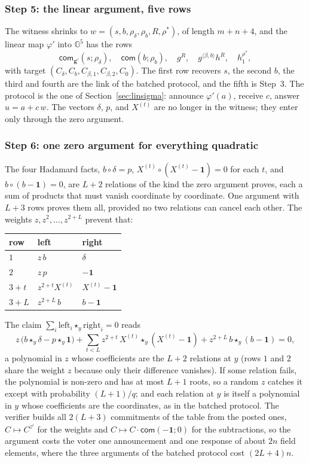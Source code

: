 \documentclass[11pt,a4paper]{article}
\newcommand{\G}{\mathbb{G}}
\newcommand{\com}{\mathsf{com}}
\theoremstyle{remark}
\begin{document}
\subsubsection*{Step 5: the linear argument, five rows}
The witness shrinks to $w = (s, b, \rho_\delta, \rho_b, R, \rho^*)$, of
length $m + n + 4$, and the linear map $\varphi'$ into $\G^5$ has the rows
\[
  \com_{\mathbf{g}'}(s; \rho_\delta),\quad \com(b; \rho_b),\quad g^{R},\quad
  g^{\langle \beta, b \rangle} h^{R},\quad h_1^{\rho^*},
\]
with target $(C_\delta, C_b, C_{\beta,1}, C_{\beta,2}, C_0)$. The first row
recovers $s$, the second $b$, the third and fourth are the link of the
batched protocol, and the fifth is Step~3. The protocol is the one of
Section~\ref{sec:linsigma}: announce $\varphi'(a)$, receive $c$, answer $u
= a + c\,w$. The vectors $\delta$, $p$, and $X^{(t)}$ are no longer in
the witness; they enter only through the zero argument.

\subsubsection*{Step 6: one zero argument for everything quadratic}
The four Hadamard facts, $b \circ \delta = p$, $X^{(t)} \circ (X^{(t)} -
\mathbf{1}) = 0$ for each $t$, and $b \circ (b - \mathbf{1}) = 0$, are
$L + 2$ relations of the kind the zero argument proves, each a sum of
products that must vanish coordinate by coordinate. One argument with $L
+ 3$ rows proves them all, provided no two relations can cancel each
other. The weights $z, z^2, \ldots, z^{2+L}$ prevent that:
\begin{center}
\begin{tabular}{@{}lll@{}}
\toprule
row & left & right \\
\midrule
$1$ & $z\, b$ & $\delta$ \\
$2$ & $z\, p$ & $-\mathbf{1}$ \\
$3 + t$ & $z^{2+t} X^{(t)}$ & $X^{(t)} - \mathbf{1}$ \\
$3 + L$ & $z^{2+L}\, b$ & $b - \mathbf{1}$ \\
\bottomrule
\end{tabular}
\end{center}
The claim $\sum_i \text{left}_i \star_y \text{right}_i = 0$ reads
\[
  z\,\big(b \star_y \delta - p \star_y \mathbf{1}\big)
  + \sum_{t < L} z^{2+t}\, X^{(t)} \star_y (X^{(t)} - \mathbf{1})
  + z^{2+L}\, b \star_y (b - \mathbf{1}) = 0,
\]
a polynomial in $z$ whose coefficients are the $L + 2$ relations at $y$
(rows $1$ and $2$ share the weight $z$ because only their difference
vanishes). If some relation fails, the polynomial is non-zero and has at
most $L + 1$ roots, so a random $z$ catches it except with probability
$(L + 1)/q$; and each relation at $y$ is itself a polynomial in $y$ whose
coefficients are the coordinates, as in the batched protocol. The
verifier builds all $2(L + 3)$ commitments of the table from the posted
ones, $C \mapsto C^{z^i}$ for the weights and $C \mapsto C \cdot
\com(-\mathbf{1}; 0)$ for the subtractions, so the argument costs the
voter one announcement and one response of about $2n$ field elements,
where the three arguments of the batched protocol cost $(2L + 4)n$.
\end{document}
